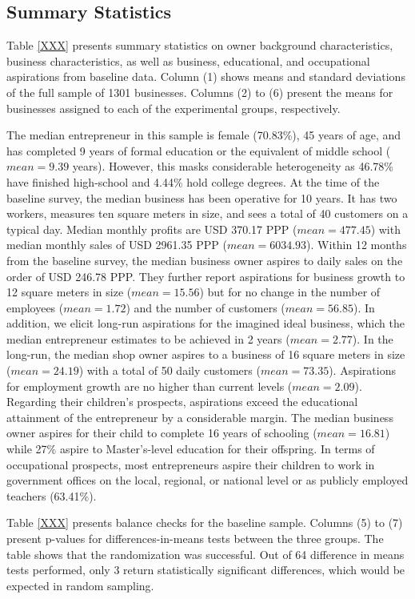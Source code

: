 \documentclass[11.5pt]{article}
\begin{document}
\subsection{Summary Statistics}

Table \ref{XXX} presents summary statistics on owner background characteristics, business characteristics, as well as business, educational, and occupational aspirations from baseline data. Column (1) shows means and standard deviations of the full sample of 1301 businesses. Columns (2) to (6) present the means for businesses assigned to each of the experimental groups, respectively.

The median entrepreneur in this sample is female (70.83\%), 45 years of age, and has completed 9 years of formal education or the equivalent of middle school ($mean = 9.39$ years). However, this masks considerable heterogeneity as 46.78\% have finished high-school and 4.44\% hold college degrees. At the time of the baseline survey, the median business has been operative for 10 years. It has two workers, measures ten square meters in size, and sees a total of 40 customers on a typical day. Median monthly profits are USD 370.17 PPP ($mean = 477.45$) with median monthly sales of USD 2961.35 PPP ($mean = 6034.93$). Within 12 months from the baseline survey, the median business owner aspires to daily sales on the order of USD 246.78 PPP. They further report aspirations for business growth to 12 square meters in size ($mean = 15.56$) but for no change in the number of employees ($mean = 1.72$) and the number of customers ($mean = 56.85$). In addition, we elicit long-run aspirations for the imagined ideal business, which the median entrepreneur estimates to be achieved in 2 years ($mean = 2.77$). In the long-run, the median shop owner aspires to a business of 16 square meters in size ($mean = 24.19$) with a total of 50 daily customers ($mean = 73.35$). Aspirations for employment growth are no higher than current levels ($mean = 2.09$). Regarding their children's prospects, aspirations exceed the educational attainment of the entrepreneur by a considerable margin. The median business owner aspires for their child to complete 16 years of schooling ($mean = 16.81$) while 27\% aspire to Master's-level education for their offspring. In terms of occupational prospects, most entrepreneurs aspire their children to work in government offices on the local, regional, or national level or as publicly employed teachers (63.41\%).

Table \ref{XXX} presents balance checks for the baseline sample. Columns (5) to (7) present p-values for differences-in-means tests between the three groups. The table shows that the randomization was successful. Out of 64 difference in means tests performed, only 3 return statistically significant differences, which would be expected in random sampling.
\end{document}
